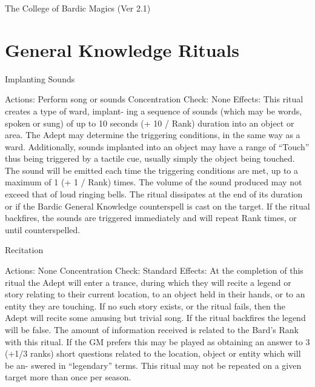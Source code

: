\begin{Chapter}{The College of Bardic Magics (Ver 2.1)}
\section{General Knowledge Rituals}

\begin{ritual}[Q-1]{Implanting Sounds }


Actions: Perform song or sounds 
Concentration Check: None 
Effects: This ritual creates a type of ward, implant-
ing  a  sequence  of  sounds  (which  may  be  words, 
spoken or sung) of up to 10 seconds (+ 10 / Rank) 
duration  into  an  object  or  area.  The  Adept  may 
determine  the  triggering  conditions,  in  the  same 
way as a ward. Additionally, sounds implanted into 
an object may have a range of “Touch” thus being 
triggered by a tactile cue, usually simply the object 
being  touched.  The  sound  will  be  emitted  each 
time  the  triggering  conditions  are  met,  up  to  a 
maximum of 1 (+ 1 / Rank) times. The volume of 
the  sound  produced  may  not  exceed  that  of  loud 
ringing bells. The ritual dissipates at the end of its 
duration or if the Bardic General Knowledge counterspell is cast on the target. If the ritual backfires, 
the  sounds  are  triggered  immediately  and  will 
repeat Rank times, or until counterspelled. 
\end{ritual}

\begin{ritual}[Q-2]{Recitation }

Actions: None 
Concentration Check: Standard 
Effects:  At  the  completion  of  this  ritual  the  Adept 
will enter a trance, during which they  will recite a 
legend or story relating to their current location, to 
an  object  held  in  their  hands,  or  to  an  entity  they 
are  touching.  If  no  such  story  exists,  or  the  ritual 
fails,  then  the  Adept  will  recite  some  amusing but 
trivial  song.  If  the  ritual  backfires  the  legend  will 
be  false.  The  amount  of  information  received  is 
related  to  the  Bard’s  Rank  with  this  ritual.  If  the 
GM  prefers  this  may  be  played  as  obtaining  an 
answer to 3 (+1/3 ranks) short questions related to 
the  location,  object  or  entity  which  will  be  an-
swered  in  “legendary”  terms.  This  ritual  may  not 
be  repeated  on  a  given  target  more  than  once  per 
season. 
\end{ritual}



\end{Chapter}

